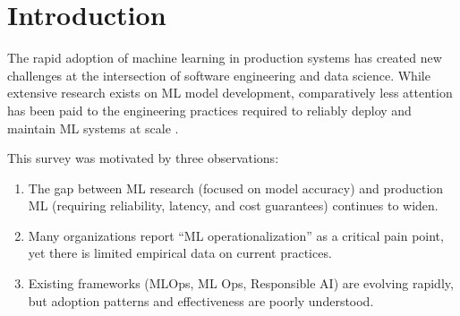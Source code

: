 \documentclass[
    language=english,
    doctype=survey-report,
    institution=none,
]{../../omnilatex}
\begin{document}
\maketitle

\begin{abstract}
This report presents findings from a national survey of software engineering
practices in machine learning (ML) deployment, conducted between January and
March 2025. The survey, developed in collaboration with the IEEE Computer
Society's Software Engineering Technical Committee, was distributed to
practitioners through professional networks, conference mailing lists, and
social media channels. A total of 1,847 valid responses were received from
32 countries, representing practitioners across industry (62\%), academia
(24\%), and government (14\%). Key findings reveal significant gaps between
ML development practices and production deployment readiness, with 67\% of
respondents reporting that model deployment is the primary bottleneck in
their ML pipeline. This report details the survey methodology, respondent
demographics, and key findings organized across five thematic areas:
development practices, testing and validation, deployment infrastructure,
monitoring and maintenance, and organizational factors.
\end{abstract}

\section{Introduction}
\label{sec:introduction}

The rapid adoption of machine learning in production systems has created
new challenges at the intersection of software engineering and data science.
While extensive research exists on ML model development, comparatively less
attention has been paid to the engineering practices required to reliably
deploy and maintain ML systems at scale \cite{amershi2019software}.

This survey was motivated by three observations:
\begin{enumerate}
    \item The gap between ML research (focused on model accuracy) and
          production ML (requiring reliability, latency, and cost guarantees)
          continues to widen.
    \item Many organizations report ``ML operationalization'' as a critical
          pain point, yet there is limited empirical data on current practices.
    \item Existing frameworks (MLOps, ML Ops, Responsible AI) are evolving
          rapidly, but adoption patterns and effectiveness are poorly understood.
\end{enumerate}
\end{document}
